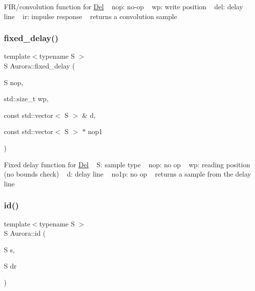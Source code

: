 F\+I\+R/convolution function for \hyperlink{class_aurora_1_1_del}{Del} ~\newline
nop\+: no-\/op ~\newline
wp\+: write position ~\newline
del\+: delay line ~\newline
ir\+: impulse response ~\newline
returns a convolution sample \mbox{\label{namespace_aurora_ad2d492fbf6dc9b468619e2403ace6e25}} 
\subsubsection{\texorpdfstring{fixed\+\_\+delay()}{fixed\_delay()}}
{\footnotesize\ttfamily template$<$typename S $>$ \\
S Aurora\+::fixed\+\_\+delay (\begin{DoxyParamCaption}\item[{S}]{nop,  }\item[{std\+::size\+\_\+t}]{wp,  }\item[{const std\+::vector$<$ S $>$ \&}]{d,  }\item[{const std\+::vector$<$ S $>$ $\ast$}]{nop1 }\end{DoxyParamCaption})\hspace{0.3cm}{\ttfamily [inline]}}

Fixed delay function for \hyperlink{class_aurora_1_1_del}{Del} ~\newline
S\+: sample type ~\newline
nop\+: no op ~\newline
wp\+: reading position (no bounds check) ~\newline
d\+: delay line ~\newline
no1p\+: no op ~\newline
returns a sample from the delay line \mbox{\label{namespace_aurora_aca47d4c2fcfc307c85418fe7a0b1e98e}} 
\subsubsection{\texorpdfstring{id()}{id()}}
{\footnotesize\ttfamily template$<$typename S $>$ \\
S Aurora\+::id (\begin{DoxyParamCaption}\item[{S}]{s,  }\item[{S}]{dr }\end{DoxyParamCaption})\hspace{0.3cm}{\ttfamily [inline]}}

